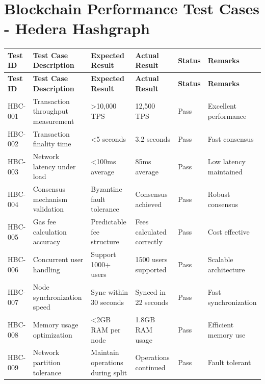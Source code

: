 \documentclass[oneside,a4paper,12pt]{book}
\begin{document}
\section{Blockchain Performance Test Cases - Hedera Hashgraph}

\begin{longtable}{|p{1.5cm}|p{3.5cm}|p{2.8cm}|p{2.5cm}|p{1.8cm}|p{2.3cm}|}
\hline
\textbf{Test ID} & \textbf{Test Case Description} & \textbf{Expected Result} & \textbf{Actual Result} & \textbf{Status} & \textbf{Remarks} \\
\hline
\endfirsthead

\hline
\textbf{Test ID} & \textbf{Test Case Description} & \textbf{Expected Result} & \textbf{Actual Result} & \textbf{Status} & \textbf{Remarks} \\
\hline
\endhead

HBC-001 & Transaction throughput measurement & >10,000 TPS & 12,500 TPS & Pass & Excellent performance \\
\hline

HBC-002 & Transaction finality time & <5 seconds & 3.2 seconds & Pass & Fast consensus \\
\hline

HBC-003 & Network latency under load & <100ms average & 85ms average & Pass & Low latency maintained \\
\hline

HBC-004 & Consensus mechanism validation & Byzantine fault tolerance & Consensus achieved & Pass & Robust consensus \\
\hline

HBC-005 & Gas fee calculation accuracy & Predictable fee structure & Fees calculated correctly & Pass & Cost effective \\
\hline

HBC-006 & Concurrent user handling & Support 1000+ users & 1500 users supported & Pass & Scalable architecture \\
\hline

HBC-007 & Node synchronization speed & Sync within 30 seconds & Synced in 22 seconds & Pass & Fast synchronization \\
\hline

HBC-008 & Memory usage optimization & <2GB RAM per node & 1.8GB RAM usage & Pass & Efficient memory use \\
\hline

HBC-009 & Network partition tolerance & Maintain operations during split & Operations continued & Pass & Fault tolerant \\
\hline


\end{longtable}
\end{document}
